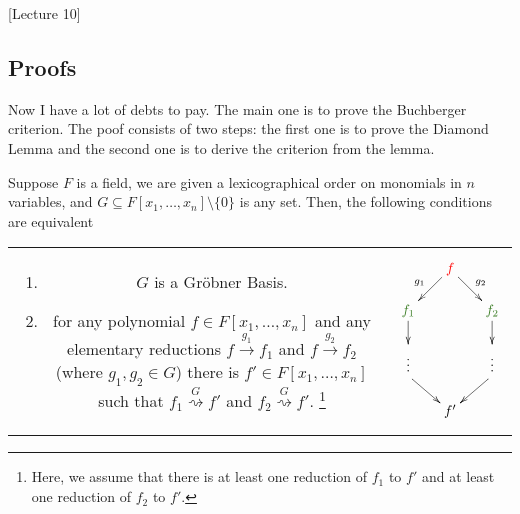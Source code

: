 [Lecture 10]


\subsection{Proofs}

Now I have a lot of debts to pay.
The main one is to prove the Buchberger criterion.
The poof consists of two steps: the first one is to prove the Diamond Lemma and the second one is to derive the criterion from the lemma.

\begin{claim}
Suppose $F$ is a field, we are given a lexicographical order on monomials in $n$ variables, and $G\subseteq F[x_1,\ldots,x_n]\setminus\{0\}$ is any set.
Then, the following conditions are equivalent

\begin{tabular}{cc}
{
\parbox{12cm}{
\begin{enumerate}
\item $G$ is a Gr\"obner Basis.

\item for any polynomial $f\in F[x_1,\ldots,x_n]$ and any elementary reductions $f\stackrel{g_1}{\longrightarrow}f_1$ and $f\stackrel{g_2}{\longrightarrow}f_2$ (where $g_1,g_2\in G$) there is $f'\in F[x_1,\ldots,x_n]$ such that $f_1\stackrel{G}{\rightsquigarrow}f'$ and $f_2\stackrel{G}{\rightsquigarrow}f'$.%
\footnote{Here, we assume that there is at least one reduction of $f_1$ to $f'$ and at least one reduction of $f_2$ to $f'$.}
\end{enumerate}
}}&{
\parbox{4cm}{
\[
\xymatrix@R=15pt@C=15pt{
	{}&{\textcolor{red}{f}}\ar[dl]_{g_1}\ar[dr]^{g_2}&{}\\
	{\textcolor{OliveGreen}{f_1}}\ar[d]&{}&{\textcolor{OliveGreen}{f_2}}\ar[d]\\
	{}\ar@{}[d]|{\vdots}&{}&{}\ar@{}[d]|{\vdots}\\
	{}\ar[dr]&{}&{}\ar[dl]\\
	{}&{f'}&{}\\
}
\]
}
}
\end{tabular}
\end{claim}
